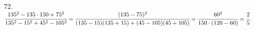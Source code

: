 72. $\cfrac{135^2-135\cdot150+75^2}{135^2-15^2+45^2-105^2}=\cfrac{(135-75)^2}{(135-15)(135+15)+(45-105)(45+105)}=
\cfrac{60^2}{150\cdot(120-60)}=\cfrac{2}{5}.$\\
